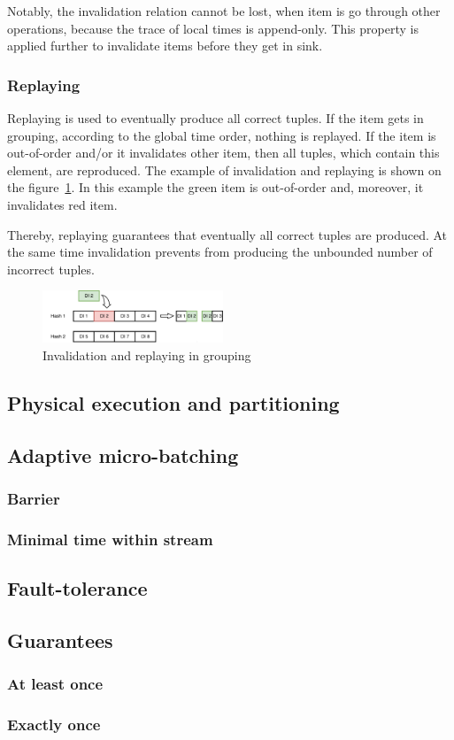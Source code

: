Notably, the invalidation relation cannot be lost, when item is go through other operations, because the trace of local times is append-only. This property is applied further to invalidate items before they get in sink.

\subsubsection{Replaying}

Replaying is used to eventually produce all correct tuples. If the item gets in grouping, according to the global time order, nothing is replayed. If the item is out-of-order and/or it invalidates other item, then all tuples, which contain this element, are reproduced. The example of invalidation and replaying is shown on the figure~\ref{grouping-invalidation-figure}. In this example the green item is out-of-order and, moreover, it invalidates red item.

Thereby, replaying guarantees that eventually all correct tuples are produced. At the same time invalidation prevents from producing the unbounded number of incorrect tuples. 

\begin{figure}[htbp]
  \centering
  \includegraphics[width=0.48\textwidth]{pics/grouping-invalidation}
  \caption{Invalidation and replaying in grouping}
  \label {grouping-invalidation-figure}
\end{figure}

\subsection{Physical execution and partitioning}

\subsection{Adaptive micro-batching}

\subsubsection{Barrier}

\subsubsection{Minimal time within stream}

\subsection{Fault-tolerance}

\subsection{Guarantees}

\subsubsection{At least once}

\subsubsection{Exactly once}




